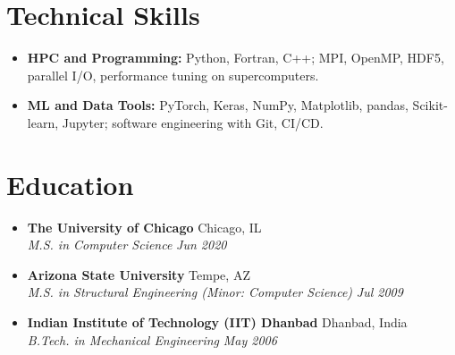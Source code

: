 \documentclass[10pt,letterpaper]{article}
\newcommand{\resumeSubHeadingListStart}{\begin{itemize}[leftmargin=0.15in, label={}]}
\newcommand{\resumeSubHeadingListEnd}{\end{itemize}}
\newcommand{\resumeSubheading}[4]{\item \textbf{\color{subheadingcolor}#1} \hfill {\color{datecolor}#2} \\ \textit{\color{sectioncolor}#3} \hfill \textit{\color{datecolor}#4}}
\begin{document}
\section*{Technical Skills}
\resumeSubHeadingListStart
  \item \textbf{HPC and Programming:} Python, Fortran, C++; MPI, OpenMP, HDF5, parallel I/O, performance tuning on supercomputers.
  \item \textbf{ML and Data Tools:} PyTorch, Keras, NumPy, Matplotlib, pandas, Scikit-learn, Jupyter; software engineering with Git, CI/CD.
\resumeSubHeadingListEnd

\section*{Education}
\vspace{-0.5em}
\resumeSubHeadingListStart
\resumeSubheading{The University of Chicago}{Chicago, IL}{M.S. in Computer Science}{Jun 2020}
\resumeSubheading{Arizona State University}{Tempe, AZ}{M.S. in Structural Engineering (Minor: Computer Science)}{Jul 2009}
\resumeSubheading{Indian Institute of Technology (IIT) Dhanbad}{Dhanbad, India}{B.Tech. in Mechanical Engineering}{May 2006}
\resumeSubHeadingListEnd
\end{document}
